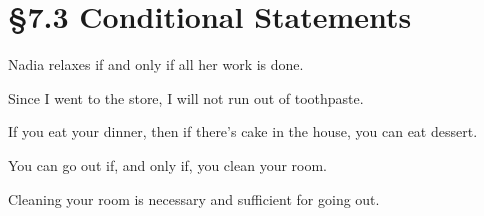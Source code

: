% 
% 

\section{\S 7.3 Conditional Statements}
\begin{enumerate}

	\begin{statement}{Nadia relaxes if and only if all her work is done.}
	\end{statement}

	\begin{statement}{Since I went to the store, I will not run out of toothpaste.}
	\end{statement}

	\begin{statement}{If you eat your dinner, then if there’s cake in the house, you can eat dessert.}
	\end{statement}

	\begin{statement}{You can go out if, and only if, you clean your room.}
	\end{statement}

	\begin{statement}{Cleaning your room is necessary and sufficient for going out.}
	\end{statement}


\end{enumerate}
% 

